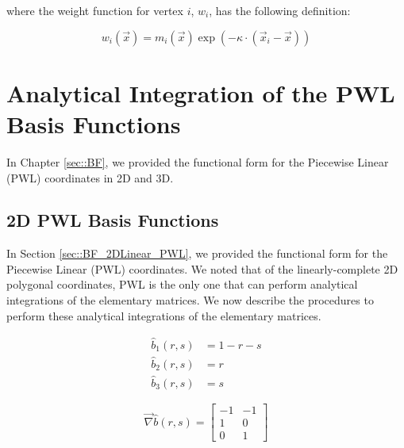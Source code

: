 \noindent where the weight function for vertex $i$, $w_i$, has the following definition:

\begin{equation}
\label{eq::App_BF_ME_weights}
w_i (\vec{x})  = m_i(\vec{x}) \exp(-  \kappa \cdot (\vec{x}_i - \vec{x}))
\end{equation}



\section{Analytical Integration of the PWL Basis Functions}
\label{sec::appendix_BF_PWLInt}

In Chapter \ref{sec::BF}, we provided the functional form for the Piecewise Linear (PWL) coordinates in 2D and 3D. 

\subsection{2D PWL Basis Functions}
\label{sec::appendix_BF_PWLInt_2D}

In Section \ref{sec::BF_2DLinear_PWL}, we provided the functional form for the Piecewise Linear (PWL) coordinates. We noted that of the linearly-complete 2D polygonal coordinates, PWL is the only one that can perform analytical integrations of the elementary matrices. We now describe the procedures to perform these analytical integrations of the elementary matrices.


\begin{equation}
\label{eq::App_BF_2D_triref}
\begin{aligned}
	\hat{b}_1(r,s) & = 1-r-s \\
	\hat{b}_2(r,s) & = r \\
	\hat{b}_3(r,s) & = s 
\end{aligned}
\end{equation}

\begin{equation}
\label{eq::App_BF_2D_triref_grad}
\vec{\nabla} \hat{b} (r,s)  = 
\left[
\begin{array}{cc}
-1 & -1 \\
1 & 0 \\
0 & 1
\end{array}
\right]
\end{equation}


